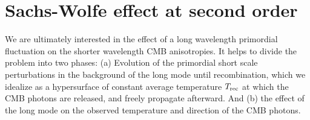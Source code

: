 \documentclass[12pt]{article}
\numberwithin{equation}{section}
\begin{document}
\section{\label{SW}Sachs-Wolfe effect at second order}

We are ultimately interested in the effect of a long wavelength primordial fluctuation on the shorter wavelength CMB anisotropies. It helps to divide the problem into two phases: (a) Evolution of the primordial short scale perturbations in the background of the long mode until recombination, which we idealize as a hypersurface of constant average temperature $T_{\rm rec}$ at which the CMB photons are released, and freely propagate afterward. And (b) the effect of the long mode on the observed temperature and direction of the CMB photons. 
\end{document}
